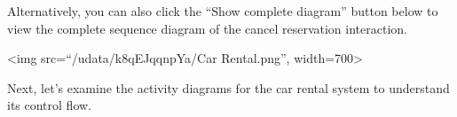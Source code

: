 Alternatively, you can also click the ``Show complete diagram'' button below to view the complete sequence diagram of the cancel reservation interaction.

\textless img src=``/udata/k8qEJqqnpYa/Car Rental.png'', width=700\textgreater{}

Next, let's examine the activity diagrams for the car rental system to understand its control flow.

